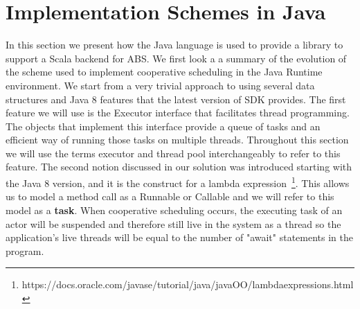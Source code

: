 \section{Implementation Schemes in Java}
\label{sec:scheme}

In this section we present how the Java language is used to provide a library to support a Scala backend for ABS. We first look a a summary of the evolution of the scheme used to implement cooperative scheduling in the Java Runtime environment. We start from a very trivial approach to using several data structures and Java 8 features that the latest version of SDK provides. The first feature we will use is the Executor interface that facilitates thread programming. The objects that implement this interface provide a queue of tasks and an efficient way of running those tasks on multiple threads. Throughout this section we will use the terms executor and thread pool interchangeably to refer to this feature. The second notion discussed in our solution was introduced starting with the Java 8 version, and it is the construct for a lambda expression~\footnote{https://docs.oracle.com/javase/tutorial/java/javaOO/lambdaexpressions.html}. This allows us to model a method call as a Runnable or Callable and we will refer to this model as a \textbf{task}. When cooperative scheduling occurs, the executing task of an actor will be suspended and therefore still live in the system as a thread so the application's live threads will be equal to the number of "await" statements in the program. 

%

